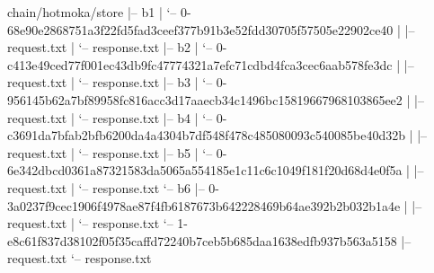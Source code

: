 \begin{shellbox}\begin{ttlst}
chain/hotmoka/store
|-- b1
|   `-- 0-68e90e2868751a3f22fd5fad3ceef377b91b3e52fdd30705f57505e22902ce40
|       |-- request.txt
|       `-- response.txt
|-- b2
|   `-- 0-c413e49ced77f001ec43db9fc47774321a7efc71cdbd4fca3cec6aab578fe3dc
|       |-- request.txt
|       `-- response.txt
|-- b3
|   `-- 0-956145b62a7bf89958fc816acc3d17aaecb34c1496bc15819667968103865ee2
|       |-- request.txt
|       `-- response.txt
|-- b4
|   `-- 0-c3691da7bfab2bfb6200da4a4304b7df548f478c485080093c540085be40d32b
|       |-- request.txt
|       `-- response.txt
|-- b5
|   `-- 0-6e342dbcd0361a87321583da5065a554185e1c11c6c1049f181f20d68d4e0f5a
|       |-- request.txt
|       `-- response.txt
`-- b6
    |-- 0-3a0237f9cec1906f4978ae87f4fb6187673b642228469b64ae392b2b032b1a4e
    |   |-- request.txt
    |   `-- response.txt
    `-- 1-e8c61f837d38102f05f35caffd72240b7ceb5b685daa1638edfb937b563a5158
        |-- request.txt
        `-- response.txt
\end{ttlst}\end{shellbox}
